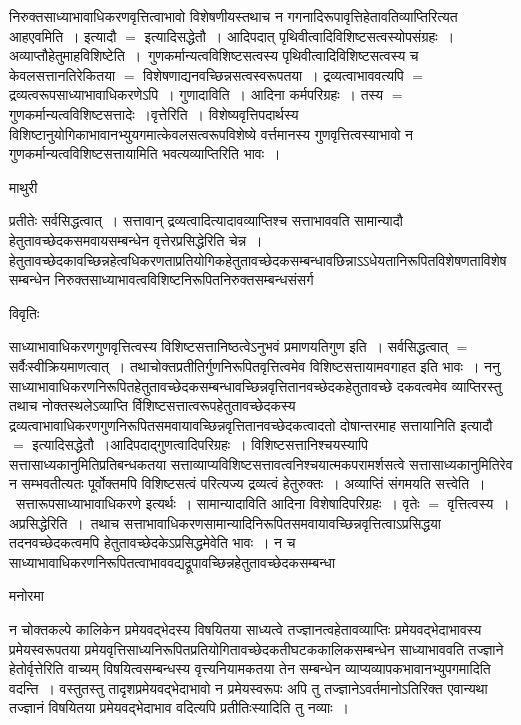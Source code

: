 \documentclass[10pt, openany]{book}
\begin{document}
{निरुक्तसाध्याभावाधिकरणवृत्तित्वाभावो विशेषणीयस्तथाच न गगनादिरूपावृत्तिहेतावतिव्याप्तिरित्यत आह\textendash  एवमिति~। इत्यादौ $=$ इत्यादिसद्धेतौ~। आदिपदात् पृथिवीत्वादिविशिष्टसत्वस्योपसंग्रहः~। अव्याप्तौहेतुमाह\textendash  विशिष्टेति~।~गुणकर्मान्यत्वविशिष्टसत्वस्य पृथिवीत्वादिविशिष्टसत्वस्य च केवलसत्तानतिरेकितया $=$ विशेषणाद्यनवच्छिन्नसत्वस्वरूपतया~। द्रव्यत्वाभाववत्यपि $=$ द्रव्यत्वरूपसाध्याभावाधिकरणेऽपि~। {\la गुणादाविति}~। आदिना कर्मपरिग्रहः~। तस्य $=$गुणकर्मान्यत्वविशिष्टसत्तादेः~।{\la वृत्तेरिति}~। विशेष्यवृत्तिपदार्थस्य विशिष्टानुयोगिकाभावानभ्युयगमात्केवलसत्वरूपविशेष्ये वर्त्तमानस्य गुणवृत्तित्वस्याभावो न गुणकर्मान्यत्वविशिष्टसत्तायामिति भवत्यव्याप्तिरिति भावः~।
\newpage
\begin{center}  माथुरी  \end{center}
{\la प्रतीतेः सर्वसिद्धत्वात्~। सत्तावान् द्रव्यत्वादित्यादावव्याप्तिश्च सत्ताभाववति सामान्यादौ हेतुतावच्छेदकसमवायसम्बन्धेन वृत्तेरप्रसिद्धेरिति चेन्न~। हेतुतावच्छेदकावच्छिन्नहेत्वधिकरणताप्रतियोगिकहेतुतावच्छेदकसम्बन्धावछिन्नाऽऽधेयतानिरूपितविशेषणताविशेषसम्बन्धेन निरुक्तसाध्याभावत्वविशिष्टनिरूपितनिरुक्तसम्बन्धसंसर्ग}
\begin{center}     विवृतिः \end{center}
साध्याभावाधिकरणगुणवृत्तित्वस्य विशिष्टसत्तानिष्ठत्वेऽनुभवं प्रमाणयतिगुण इति~। सर्वसिद्धत्वात् $=$ सर्वैःस्वीक्रियमाणत्वात्~। तथाचोक्तप्रतीतिर्गुणनिरूपितवृत्तित्वमेव विशिष्टसत्तायामवगाहत इति भावः~। ननु साध्याभावाधिकरणनिरूपितहेतुतावच्छेदकसम्बन्धावच्छिन्नवृत्तितानवच्छेदकहेतुतावच्छे दकवत्वमेव व्याप्तिरस्तु तथाच नोक्तस्थलेऽव्याप्ति र्विशिष्टसत्तात्वरूपहेतुतावच्छेदकस्य द्रव्यत्वाभावाधिकरणगुणनिरूपितसमवायावच्छिन्नवृत्तितानवच्छेदकत्वादतो दोषान्तरमाह \textendash  सत्तायानिति इत्यादौ $=$ इत्यादिसद्धेतौ~।आदिपदाद्गुणत्वादिपरिग्रहः~। विशिष्टसत्तानिश्चयस्यापि सत्तासाध्यकानुमितिप्रतिबन्धकतया सत्ताव्याप्यविशिष्टसत्तावत्वनिश्चयात्मकपरामर्शसत्वे
सत्तासाध्यकानुमितिरेव न सम्भवतीत्यतः पूर्वोक्तमपि विशिष्टसत्वं परित्यज्य द्रव्यत्वं हेतुरुक्तः~। अव्याप्तिं संगमयति {\qt सत्त्वेति~}।~सत्तारूपसाध्याभावाधिकरणे इत्यर्थः~।
{\qt सामान्यादाविति }आदिना विशेषादिपरिग्रहः~। वृतेः $=$ वृत्तित्वस्य~।{\qt अप्रसिद्धेरिति~}।~तथाच सत्ताभावाधिकरणसामान्यादिनिरूपितसमवायावच्छिन्नवृत्तित्वाऽप्रसिद्धया तदनवच्छेदकत्वमपि हेतुतावच्छेदकेऽप्रसिद्धमेवेति भावः~। न च साध्याभावाधिकरणनिरूपितत्वाभाववद्यद्रूपावच्छिन्नहेतुतावच्छेदकसम्बन्धा
\begin{center}   मनोरमा  \end{center}

न चोक्तकल्पे कालिकेन प्रमेयवद्भेदस्य विषयितया साध्यत्वे तज्ज्ञानत्वहेतावव्याप्तिः प्रमेयवद्भेदाभावस्य प्रमेयस्वरूपतया प्रमेयवृत्तिसाध्यनिरूपितप्रतियोगितावच्छेदकतीघटककालिकसम्बन्धेन साध्याभाववति तज्ज्ञाने हेतोर्वृत्तेरिति वाच्यम् विषयित्वसम्बन्धस्य वृत्त्यनियामकतया तेन सम्बन्धेन व्याप्यव्यापकभावानभ्युपगमादिति वदन्ति~। वस्तुतस्तु तादृशप्रमेयवद्भेदाभावो न प्रमेयस्वरूपः अपि तु तज्ज्ञानेऽवर्तमानोऽतिरिक्त एवान्यथा तज्ज्ञानं विषयितया प्रमेयवद्भेदाभाव वदित्यपि प्रतीतिःस्यादिति तु नव्याः~।\\

}
\end{document}
